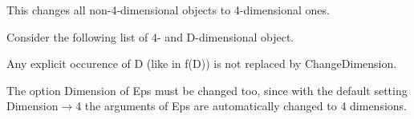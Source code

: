 





This changes all non-4-dimensional objects to 4-dimensional ones.



Consider the following list of 4- and D-dimensional object.







Any explicit occurence of D (like in f(D)) is not replaced by ChangeDimension.


The option Dimension of Eps must be changed too, since with the default setting Dimension\(\rightarrow \)4 the arguments of Eps are
  automatically changed to 4 dimensions.



